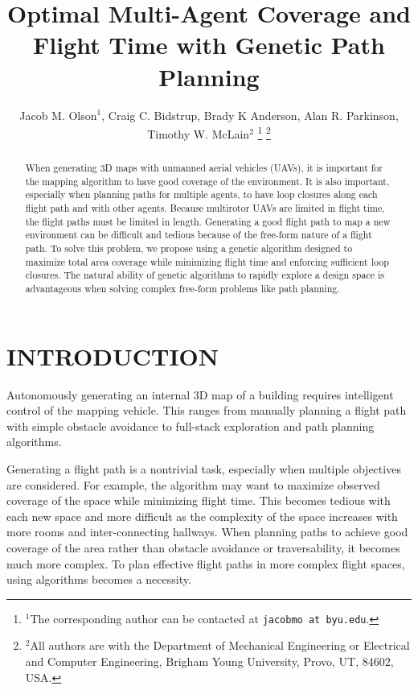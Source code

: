 \documentclass[letterpaper, 10 pt, conference]{ieeeconf}  %
\title{\LARGE \bf
Optimal Multi-Agent Coverage and Flight Time with Genetic Path Planning
}
\author{Jacob M. Olson$^{1}$, Craig C. Bidstrup, Brady K Anderson, Alan R. Parkinson, Timothy W. McLain$^{2}$%
\thanks{$^{1}$The corresponding author can be contacted at
        {\tt\small jacobmo at byu.edu}.}%
\thanks{$^{2}$All authors are with the Department of Mechanical Engineering or Electrical and Computer Engineering,
        Brigham Young University, Provo, UT, 84602, USA.}%
}
\begin{document}
\maketitle
\thispagestyle{empty}
\pagestyle{empty}


\begin{abstract}

When generating 3D maps with unmanned aerial vehicles (UAVs), it is important for the mapping algorithm to have good coverage of the environment. It is also important, especially when planning paths for multiple agents, to have loop closures along each flight path and with other agents. Because multirotor UAVs are limited in flight time, the flight paths must be limited in length. Generating a good flight path to map a new environment can be difficult and tedious because of the free-form nature of a flight path. To solve this problem, we propose using a genetic algorithm designed to maximize total area coverage while minimizing flight time and enforcing sufficient loop closures. The natural ability of genetic algorithms to rapidly explore a design space is advantageous when solving complex free-form problems like path planning.

\end{abstract}


\section{INTRODUCTION}


Autonomously generating an internal 3D map of a building requires intelligent control of the mapping vehicle. This ranges from manually planning a flight path with simple obstacle avoidance to full-stack exploration and path planning algorithms.

Generating a flight path is a nontrivial task, especially when multiple objectives are considered. For example, the algorithm may want to maximize observed coverage of the space while minimizing flight time. This becomes tedious with each new space and more difficult as the complexity of the space increases with more rooms and inter-connecting hallways. When planning paths to achieve good coverage of the area rather than obstacle avoidance or traversability, it becomes much more complex. To plan effective flight paths in more complex flight spaces, using algorithms becomes a necessity.
\end{document}
